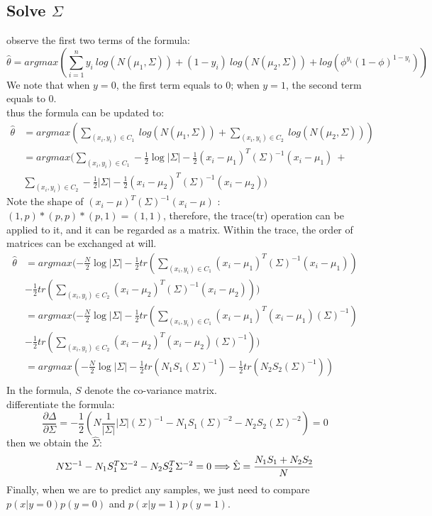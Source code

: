 \documentclass{report}
\begin{document}
\subsection{Solve $\Sigma$}
observe the first two terms of the formula:
$$
\hat{\theta}=argmax(\sum_{i=1}^n y_i\ log(N(\mu_1,\Sigma))+(1-y_i)\ log(N(\mu_2,\Sigma))+log(\phi^{y_i} (1-\phi)^{1-y_i}))
$$
We note that when $y=0$, the first term equals to $0$; when $y=1$, the second term equals to $0$.\\
thus the formula can be updated to:
$$
\begin{aligned}
\hat{\theta}
&=argmax(\sum_{(x_i,y_i)\in C_1} \ log(N(\mu_1,\Sigma))+\sum_{(x_i,y_i)\in C_2}\ log(N(\mu_2,\Sigma)))\\
&=argmax(\sum_{(x_i,y_i)\in C_1} -\frac{1}{2}\log|\Sigma|-\frac{1}{2}(x_i-\mu_1)^T(\Sigma)^{-1}(x_i-\mu_1)\ +\\
&\sum_{(x_i,y_i)\in C_2} -\frac{1}{2}|\Sigma|-\frac{1}{2}(x_i-\mu_2)^T(\Sigma)^{-1}(x_i-\mu_2))
\end{aligned}
$$
Note the shape of $(x_i-\mu)^T(\Sigma)^{-1}(x_i-\mu)$ : $(1,p)* (p,p) * (p,1)=(1,1)$, therefore, the trace(tr) operation can be applied to it, and it can be regarded as a matrix. Within the trace, the order of matrices can be exchanged at will.
$$
\begin{aligned}
\hat{\theta}
&=argmax(-\frac{N}{2}\log|\Sigma|-\frac{1}{2}tr(\sum_{(x_i,y_i)\in C_1}(x_i-\mu_1)^T(\Sigma)^{-1}(x_i-\mu_1))\\
&-\frac{1}{2}tr(\sum_{(x_i,y_i)\in C_2}(x_i-\mu_2)^T(\Sigma)^{-1}(x_i-\mu_2)))\\
&=argmax(-\frac{N}{2}\log|\Sigma|-\frac{1}{2}tr(\sum_{(x_i,y_i)\in C_1}(x_i-\mu_1)^T(x_i-\mu_1)(\Sigma)^{-1})\\
&-\frac{1}{2}tr(\sum_{(x_i,y_i)\in C_2}(x_i-\mu_2)^T(x_i-\mu_2)(\Sigma)^{-1}))\\
&=argmax(-\frac{N}{2}\log|\Sigma|-\frac{1}{2}tr(N_1 S_1(\Sigma)^{-1})
-\frac{1}{2}tr(N_2 S_2(\Sigma)^{-1}))\\
\end{aligned}
$$
In the formula, $S$ denote the co-variance matrix.\\
differentiate the formula:
$$
\frac{\partial \Delta}{\partial \Sigma}=-\frac{1}{2}(N \frac{1}{|\Sigma|}|\Sigma|(\Sigma)^{-1}-N_1S_1(\Sigma)^{-2}-N_2S_2(\Sigma)^{-2})=0
$$
then we obtain the $\hat{\Sigma}$: 
$$
N \Sigma^{-1}-N_{1} S_{1}^{T} \Sigma^{-2}-N_{2} S_{2}^{T} \Sigma^{-2}=0\\
\Longrightarrow \hat{\Sigma}=\frac{N_{1} S_{1}+N_{2} S_{2}}{N}
$$
Finally, when we are to predict any samples, we just need to compare $p(x|y=0)p(y=0)$ and $p(x|y=1)p(y=1)$.
\newpage
\end{document}

